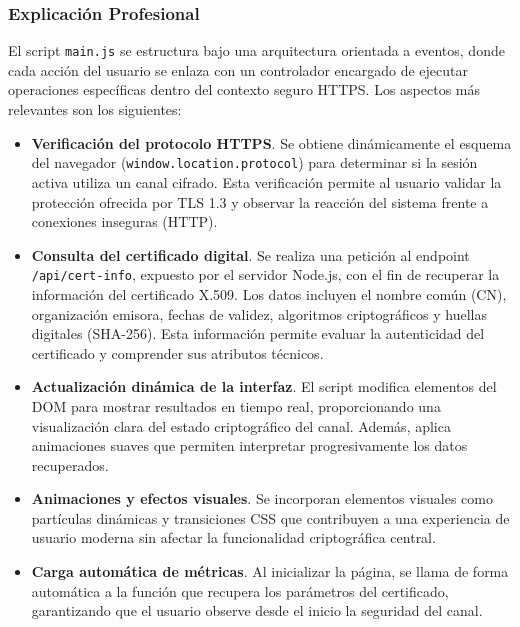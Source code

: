 \subsubsection*{Explicación Profesional}

El script \texttt{main.js} se estructura bajo una arquitectura orientada a eventos, donde cada acción del usuario se enlaza con un controlador encargado de ejecutar operaciones específicas dentro del contexto seguro HTTPS. Los aspectos más relevantes son los siguientes:

\begin{itemize}
  \item \textbf{Verificación del protocolo HTTPS}.  
  Se obtiene dinámicamente el esquema del navegador (\texttt{window.location.protocol}) para determinar si la sesión activa utiliza un canal cifrado. Esta verificación permite al usuario validar la protección ofrecida por TLS 1.3 y observar la reacción del sistema frente a conexiones inseguras (HTTP).

  \item \textbf{Consulta del certificado digital}.  
  Se realiza una petición al endpoint \texttt{/api/cert-info}, expuesto por el servidor Node.js, con el fin de recuperar la información del certificado X.509. Los datos incluyen el nombre común (CN), organización emisora, fechas de validez, algoritmos criptográficos y huellas digitales (SHA-256). Esta información permite evaluar la autenticidad del certificado y comprender sus atributos técnicos.

  \item \textbf{Actualización dinámica de la interfaz}.  
  El script modifica elementos del DOM para mostrar resultados en tiempo real, proporcionando una visualización clara del estado criptográfico del canal. Además, aplica animaciones suaves que permiten interpretar progresivamente los datos recuperados.

  \item \textbf{Animaciones y efectos visuales}.  
  Se incorporan elementos visuales como partículas dinámicas y transiciones CSS que contribuyen a una experiencia de usuario moderna sin afectar la funcionalidad criptográfica central.

  \item \textbf{Carga automática de métricas}.  
  Al inicializar la página, se llama de forma automática a la función que recupera los parámetros del certificado, garantizando que el usuario observe desde el inicio la seguridad del canal.
\end{itemize}


